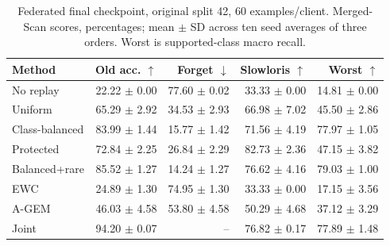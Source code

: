 \begin{table}[t]
\centering
\caption{Federated final checkpoint, original split 42, 60 examples/client. Merged-Scan scores, percentages; mean $\pm$ SD across ten seed averages of three orders. Worst is supported-class macro recall.}
\label{tab:main}
\footnotesize
\setlength{\tabcolsep}{2.5pt}
\begin{tabular}{lrrrr}
\toprule
Method & Old acc. $\uparrow$ & Forget $\downarrow$ & Slowloris $\uparrow$ & Worst $\uparrow$\\
\midrule
No replay & 22.22 $\pm$ 0.00 & 77.60 $\pm$ 0.02 & 33.33 $\pm$ 0.00 & 14.81 $\pm$ 0.00\\
Uniform & 65.29 $\pm$ 2.92 & 34.53 $\pm$ 2.93 & 66.98 $\pm$ 7.02 & 45.50 $\pm$ 2.86\\
Class-balanced & 83.99 $\pm$ 1.44 & 15.77 $\pm$ 1.42 & 71.56 $\pm$ 4.19 & 77.97 $\pm$ 1.05\\
Protected & 72.84 $\pm$ 2.25 & 26.84 $\pm$ 2.29 & 82.73 $\pm$ 2.36 & 47.15 $\pm$ 3.82\\
Balanced+rare & 85.52 $\pm$ 1.27 & 14.24 $\pm$ 1.27 & 76.62 $\pm$ 4.16 & 79.03 $\pm$ 1.00\\
EWC & 24.89 $\pm$ 1.30 & 74.95 $\pm$ 1.30 & 33.33 $\pm$ 0.00 & 17.15 $\pm$ 3.56\\
A-GEM & 46.03 $\pm$ 4.58 & 53.80 $\pm$ 4.58 & 50.29 $\pm$ 4.68 & 37.12 $\pm$ 3.29\\
Joint & 94.20 $\pm$ 0.07 & -- & 76.82 $\pm$ 0.17 & 77.89 $\pm$ 1.48\\
\bottomrule
\end{tabular}
\end{table}
